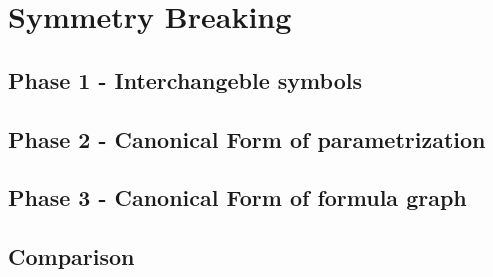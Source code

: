 \section{Symmetry Breaking}

\subsection{Phase 1 - Interchangeble symbols}

\subsection{Phase 2 - Canonical Form of parametrization}

\subsection{Phase 3 - Canonical Form of formula graph}

\subsection{Comparison}
